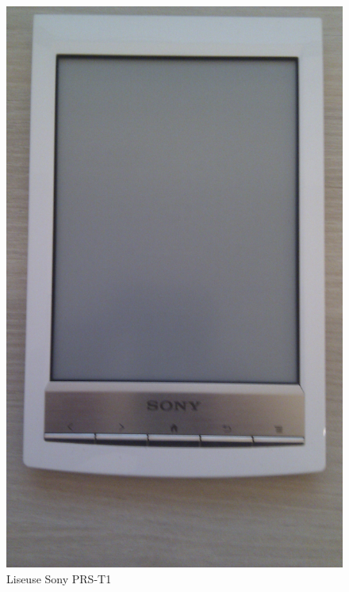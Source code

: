 \begin{figure}[h!]
	\begin{center}
		\includegraphics[scale=0.08]{LiseuseSonyPRST1.jpg}
		\caption{Liseuse Sony PRS-T1}
	\end{center}
\end{figure}
